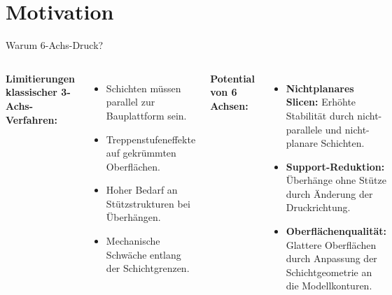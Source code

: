 \section{Motivation}

\begin{frame}{Warum 6-Achs-Druck?}
    \begin{columns}[T]
            \textbf{Limitierungen klassischer 3-Achs-Verfahren:}
            \begin{itemize}
                \item Schichten müssen parallel zur Bauplattform sein.
                \item Treppenstufeneffekte auf gekrümmten Oberflächen.
                \item Hoher Bedarf an Stützstrukturen bei Überhängen.
                \item Mechanische Schwäche entlang der Schichtgrenzen.
            \end{itemize}
            
            \vspace{0.25cm}
            \textbf{Potential von 6 Achsen:}
            \begin{itemize}
                \item \textcolor{SecondaryColor}{\textbf{Nichtplanares Slicen:}} 
                    Erhöhte Stabilität durch nicht-parallele und nicht-planare Schichten.
                \item \textcolor{SecondaryColor}{\textbf{Support-Reduktion:}} 
                    Überhänge ohne Stütze durch Änderung der Druckrichtung.
                \item \textcolor{SecondaryColor}{\textbf{Oberflächenqualität:}}
                    Glattere Oberflächen durch Anpassung der Schichtgeometrie an die Modellkonturen.
            \end{itemize}

            \centering
            \begin{tcolorbox}[
                enhanced, colback=white, colframe=PrimaryColor!30, arc=2mm, boxrule=0.5pt,
                title={Planar (3-Achs)}, fonttitle=\bfseries\tiny, coltitle=PrimaryColor, colbacktitle=PrimaryColor!10
            ]
                \centering
            \end{tcolorbox}
            

\end{columns}
\end{frame}
